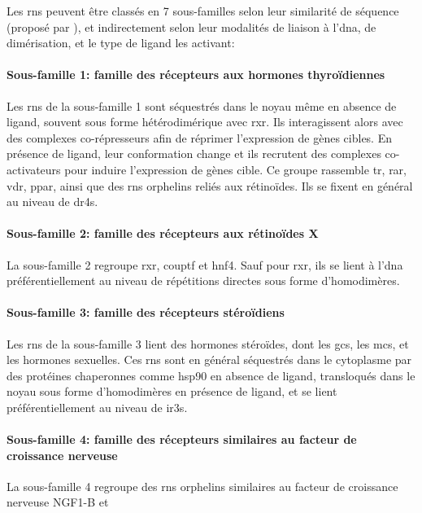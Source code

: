 Les \glspl{rn} peuvent être classés en 7 sous-familles selon leur similarité de séquence (proposé par \citet{Laudet1997,Committee1999}), et indirectement selon leur modalités de liaison à l'\gls{dna}, de dimérisation, et le type de ligand les activant:

\paragraph{Sous-famille 1: famille des récepteurs aux hormones thyroïdiennes}
Les \glspl{rn} de la sous-famille 1 sont séquestrés dans le noyau même en absence de ligand, souvent sous forme hétérodimérique avec \gls{rxr}.
Ils interagissent alors avec des complexes co-répresseurs afin de réprimer l'expression de gènes cibles.
En présence de ligand, leur conformation change et ils recrutent des complexes co-activateurs pour induire l'expression de gènes cible.
Ce groupe rassemble \gls{tr}, \gls{rar}, \gls{vdr}, \gls{ppar}, ainsi que des \glspl{rn} orphelins reliés aux rétinoïdes. Ils se fixent en général au niveau de \glspl{dr4}.

\paragraph{Sous-famille 2: famille des récepteurs aux rétinoïdes X}
La sous-famille 2 regroupe \gls{rxr}, \gls{couptf} et \gls{hnf4}.
Sauf pour \gls{rxr}, ils se lient à l'\gls{dna} préférentiellement au niveau de répétitions directes sous forme d'homodimères.

\paragraph{Sous-famille 3: famille des récepteurs stéroïdiens}
Les \glspl{rn} de la sous-famille 3 lient des hormones stéroïdes, dont les \glspl{gc}, les \glspl{mc}, et les hormones sexuelles. Ces \glspl{rn} sont en général séquestrés dans le cytoplasme par des protéines chaperonnes comme \gls{hsp90} en absence de ligand, transloqués dans le noyau sous forme d'homodimères en présence de ligand, et se lient préférentiellement au niveau de \glspl{ir3}.

\paragraph{Sous-famille 4: famille des récepteurs similaires au facteur de croissance nerveuse}
La sous-famille 4 regroupe des \glspl{rn} orphelins similaires au facteur de croissance nerveuse NGF1-B et 

